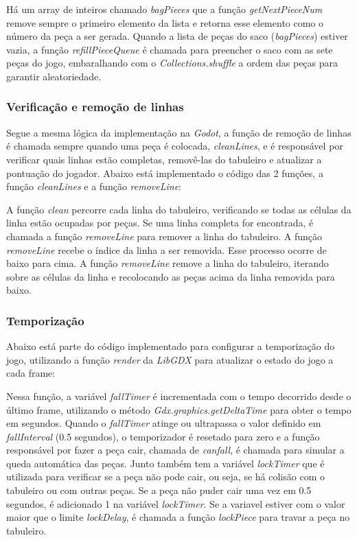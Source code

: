 

Há um array de inteiros chamado \textit{bagPieces} que a função \textit{getNextPieceNum} remove sempre o primeiro elemento da lista e retorna esse elemento como o número da peça a ser gerada. Quando a lista de peças do saco (\textit{bagPieces}) estiver vazia, a função \textit{refillPieceQueue} é chamada para preencher o saco com as sete peças do jogo, embaralhando com o \textit{Collections.shuffle} a ordem das peças para garantir aleatoriedade.

\subsubsection{Verificação e remoção de linhas}

Segue a mesma lógica da implementação na \textit{Godot}, a função de remoção de linhas é chamada sempre quando uma peça é colocada, \textit{cleanLines}, e é responsável por verificar quais linhas estão completas, removê-las do tabuleiro e atualizar a pontuação do jogador. Abaixo está implementado o código das 2 funções, a função \textit{cleanLines} e a função \textit{removeLine}:



A função \textit{clean} percorre cada linha do tabuleiro, verificando se todas as células da linha estão ocupadas por peças. Se uma linha completa for encontrada, é chamada a função \textit{removeLine} para remover a linha do tabuleiro. A função \textit{removeLine} recebe o índice da linha a ser removida. Esse processo ocorre de baixo para cima. A função \textit{removeLine} remove a linha do tabuleiro, iterando sobre as células da linha e recolocando as peças acima da linha removida para baixo.

\subsubsection{Temporização}

Abaixo está parte do código implementado para configurar a temporização do jogo, utilizando a função \textit{render} da \textit{LibGDX} para atualizar o estado do jogo a cada frame:



Nessa função, a variável \textit{fallTimer} é incrementada com o tempo decorrido desde o último frame, utilizando o método \textit{Gdx.graphics.getDeltaTime} para obter o tempo em segundos. Quando o \textit{fallTimer} atinge ou ultrapassa o valor definido em \textit{fallInterval} (0.5 segundos), o temporizador é resetado para zero e a função responsável por fazer a peça cair, chamada de \textit{canfall}, é chamada para simular a queda automática das peças. Junto também tem a variável \textit{lockTimer} que é utilizada para verificar se a peça não pode cair, ou seja, se há colisão com o tabuleiro ou com outras peças. Se a peça não puder cair uma vez em 0.5 segundos, é adicionado 1 na variável \textit{lockTimer}. Se a variavel estiver com o valor maior que o limite \textit{lockDelay}, é chamada a função \textit{lockPiece} para travar a peça no tabuleiro.


